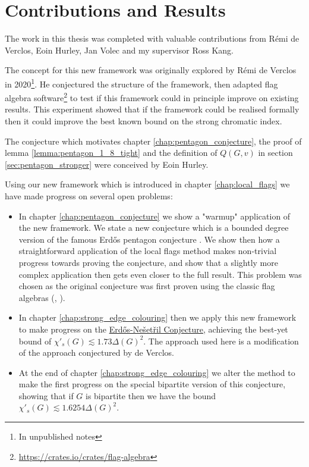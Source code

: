 \section*{Contributions and Results}

The work in this thesis was completed with valuable contributions from Rémi de Verclos,
Eoin Hurley, Jan Volec and my supervisor Ross Kang.

The concept for this new framework was originally explored by Rémi de Verclos in
2020\footnote{In unpublished notes}.
He conjectured the structure of the framework, then adapted flag algebra
software\footnote{\url{https://crates.io/crates/flag-algebra}}
to test if this framework could in principle improve on existing results.
This experiment showed that if the framework could be realised formally then it could improve the
best known bound on the strong chromatic index.

The conjecture which motivates chapter \ref{chap:pentagon_conjecture}, the
proof of lemma \ref{lemma:pentagon_1_8_tight} and the definition of $Q(G,v)$ in
section \ref{sec:pentagon_stronger} were conceived by Eoin Hurley.

\hfill

Using our new framework which is introduced in chapter \ref{chap:local_flags}
we have made progress on several open problems:
\begin{itemize}
    \item In chapter \ref{chap:pentagon_conjecture} we show a "warmup" application of the new
        framework. We state a new conjecture which is a bounded degree version of the famous
        Erd\H{o}s pentagon conjecture \cite{erdos_pentagon_1984}.
        We show then how a straightforward application of the local flags method makes non-trivial
        progress towards proving the conjecture, and show that a slightly more complex application
        then gets even closer to the full result.
        This problem was chosen as the original conjecture was first proven using
        the classic flag algebras (\cite{hatamiNumberPentagonsTrianglefree2013},
        \cite{grzesikMaximumNumberFivecycles2012}).
    \item In chapter \ref{chap:strong_edge_colouring} then we apply this new framework to make progress on the
        \hyperref[conj:intro_erdos_nesetril]{Erd\H{o}s-Nešetřil Conjecture}, achieving the best-yet
        bound of $\chi'_s(G) \lesssim 1.73\Delta(G)^2$. The approach used here is a modification
        of the approach conjectured by de Verclos.
    \item At the end of chapter \ref{chap:strong_edge_colouring} we alter the method to make
        the first progress on the special bipartite version of this conjecture, showing that
        if $G$ is bipartite then we have the bound $\chi'_s(G) \lesssim 1.6254\Delta(G)^2$.
\end{itemize}
